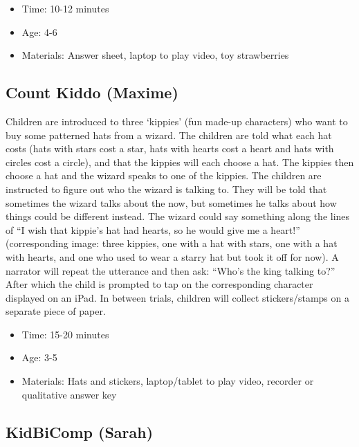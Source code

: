 \documentclass[
]{book}
\providecommand{\tightlist}{%
  \setlength{\itemsep}{0pt}\setlength{\parskip}{0pt}}
\begin{document}
\begin{itemize}
\tightlist
\item
  Time: 10-12 minutes
\item
  Age: 4-6
\item
  Materials: Answer sheet, laptop to play video, toy strawberries
\end{itemize}

\hypertarget{count-kiddo-maxime}{%
\subsection*{Count Kiddo (Maxime)}\label{count-kiddo-maxime}}

Children are introduced to three `kippies' (fun made-up characters) who want to buy some patterned hats from a wizard. The children are told what each hat costs (hats with stars cost a star, hats with hearts cost a heart and hats with circles cost a circle), and that the kippies will each choose a hat. The kippies then choose a hat and the wizard speaks to one of the kippies. The children are instructed to figure out who the wizard is talking to. They will be told that sometimes the wizard talks about the now, but sometimes he talks about how things could be different instead. The wizard could say something along the lines of ``I wish that kippie's hat had hearts, so he would give me a heart!'' (corresponding image: three kippies, one with a hat with stars, one with a hat with hearts, and one who used to wear a starry hat but took it off for now). A narrator will repeat the utterance and then ask: ``Who's the king talking to?'' After which the child is prompted to tap on the corresponding character displayed on an iPad. In between trials, children will collect stickers/stamps on a separate piece of paper.

\begin{itemize}
\tightlist
\item
  Time: 15-20 minutes
\item
  Age: 3-5
\item
  Materials: Hats and stickers, laptop/tablet to play video, recorder or qualitative answer key
\end{itemize}

\hypertarget{kidbicomp-sarah}{%
\subsection*{KidBiComp (Sarah)}\label{kidbicomp-sarah}}
\end{document}
